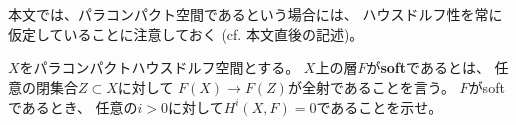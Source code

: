 \documentclass[uplatex,dvipdfmx]{jsarticle}
\begin{document}
\maketitle
\HeaderCommentA
\section{}

本文では、パラコンパクト空間であるという場合には、
ハウスドルフ性を常に仮定していることに注意しておく
(cf. 本文\cite[Proposition 2.5.1]{kashiwara2002sheaves}直後の記述)。
\fi


\begin{prob}\label{2.5}
  \(X\)をパラコンパクトハウスドルフ空間とする。
  \(X\)上の層\(F\)が\textbf{soft}であるとは、
  任意の閉集合\(Z\subset X\)に対して
  \(F(X)\to F(Z)\)が全射であることを言う。
  \(F\)がsoftであるとき、
  任意の\(i > 0\)に対して\(H^i(X,F)=0\)であることを示せ。
\end{prob}
\end{document}
